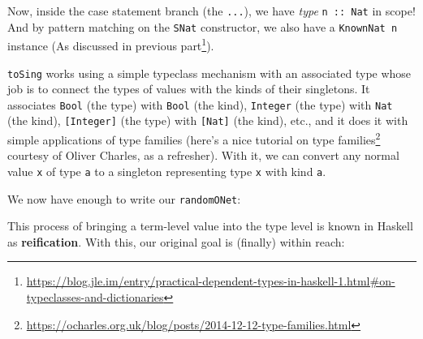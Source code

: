 \documentclass[]{article}
\newenvironment{Shaded}{}{}
\newcommand{\CommentTok}[1]{\textcolor[rgb]{0.38,0.63,0.69}{\textit{#1}}}
\newcommand{\DataTypeTok}[1]{\textcolor[rgb]{0.56,0.13,0.00}{#1}}
\newcommand{\KeywordTok}[1]{\textcolor[rgb]{0.00,0.44,0.13}{\textbf{#1}}}
\newcommand{\NormalTok}[1]{#1}
\newcommand{\OperatorTok}[1]{\textcolor[rgb]{0.40,0.40,0.40}{#1}}
\newcommand{\OtherTok}[1]{\textcolor[rgb]{0.00,0.44,0.13}{#1}}
\renewcommand{\href}[2]{#2\footnote{\url{#1}}}
\begin{document}
Now, inside the case statement branch (the \texttt{...}), we have \emph{type}
\texttt{n\ ::\ Nat} in scope! And by pattern matching on the \texttt{SNat}
constructor, we also have a \texttt{KnownNat\ n} instance (As discussed in
\href{https://blog.jle.im/entry/practical-dependent-types-in-haskell-1.html\#on-typeclasses-and-dictionaries}{previous
part}).

\texttt{toSing} works using a simple typeclass mechanism with an associated type
whose job is to connect the types of values with the kinds of their singletons.
It associates \texttt{Bool} (the type) with \texttt{Bool} (the kind),
\texttt{Integer} (the type) with \texttt{Nat} (the kind), \texttt{{[}Integer{]}}
(the type) with \texttt{{[}Nat{]}} (the kind), etc., and it does it with simple
applications of type families (here's a
\href{https://ocharles.org.uk/blog/posts/2014-12-12-type-families.html}{nice
tutorial on type families} courtesy of Oliver Charles, as a refresher). With it,
we can convert any normal value \texttt{x} of type \texttt{a} to a singleton
representing type \texttt{x} with kind \texttt{a}.

We now have enough to write our \texttt{randomONet}:

\begin{Shaded}
\end{Shaded}

This process of bringing a term-level value into the type level is known in
Haskell as \textbf{reification}. With this, our original goal is (finally)
within reach:
\end{document}
